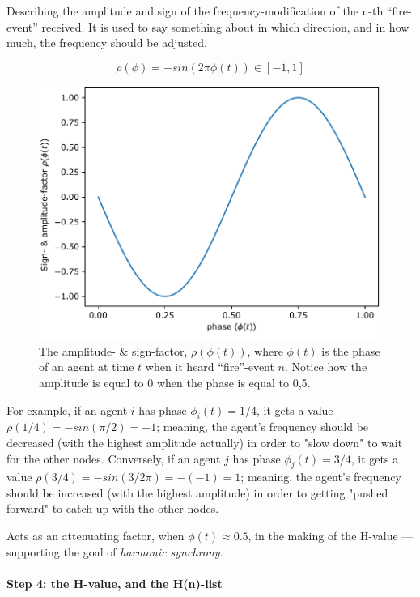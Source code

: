 	Describing the amplitude and sign of the frequency-modification of the n-th ``fire-event'' received. It is used to say something about in which direction, and in how much, the frequency should be adjusted.

	\begin{equation}
	\label{amp_sign_freq_adj}
		\rho(\phi) = - sin(2\pi\phi(t)) \in [-1, 1]
	\end{equation}

	\begin{figure}[ht!]
		\centering
		\includegraphics[width=0.65\linewidth]{Assets/DocSegments/Chapters/Baseline/Figures/Functions/rho_n.pdf}
		\caption[Plot of amplitude- \& sign-factor for K. Nymoen's frequency-adjustment]{The amplitude- \& sign-factor, $\rho(\phi(t))$, where $\phi(t)$ is the phase of an agent at time $t$ when it heard ``fire''-event $n$. Notice how the amplitude is equal to 0 when the phase is equal to 0,5.}
		\label{fig:rho_n}
	\end{figure}

	For example, if an agent $i$ has phase $\phi_i(t)=1/4$, it gets a value $\rho(1/4) = - sin(\pi/2) = -1$; meaning, the agent's frequency should be decreased (with the highest amplitude actually) in order to "slow down" to wait for the other nodes. Conversely, if an agent $j$ has phase $\phi_j(t)=3/4$, it gets a value $\rho(3/4) = - sin(3/2 \pi) = -(-1) = 1$; meaning, the agent's frequency should be increased (with the highest amplitude) in order to getting "pushed forward" to catch up with the other nodes.

	Acts as an attenuating factor, when $\phi(t)\approx0.5$, in the making of the H-value — supporting the goal of \textit{harmonic synchrony}.
	

	\paragraph{Step 4: the H-value, and the H(n)-list}
	\label{H_n}

